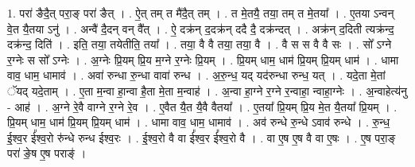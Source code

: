 \documentclass[17pt]{extarticle}
\begin{document}
1. परा॑ ङैदै॒त् परा॒ङ् परा॑ ङैत् । . ऐ॒त् तम् त मै॑दै॒त् तम् । . त मे॒तयै॒ तया॒ तम् त मे॒तया᳚ । . ए॒तया ऽन्वन् वे॒त यै॒तया ऽनु॑ । . अन्वै॑ दै॒दन् वन् वै᳚त् । . ऐ॒ दक्र॑न् द॒दक्र॑न् ददै दै॒ दक्र॑न्दत् । . अक्र॑न् द॒दिती त्यक्र॑न्द॒ दक्र॑न्द॒ दिति॑ । . इति॒ तया॒ तयेतीति॒ तया᳚ । . तया॒ वै वै तया॒ तया॒ वै । . वै स स वै वै सः । . सो᳚ ऽग्ने र॒ग्नेः स सो᳚ ऽग्नेः । . अ॒ग्नेः प्रि॒यम् प्रि॒य म॒ग्ने र॒ग्नेः प्रि॒यम् । . प्रि॒यम् धाम॒ धाम॑ प्रि॒यम् प्रि॒यम् धाम॑ । . धामा वाव॒ धाम॒ धामाव॑ । . अवा॑ रुन्धा रु॒न्धा वावा॑ रुन्ध । . अ॒रु॒न्ध॒ यद् यद॑रुन्धा रुन्ध॒ यत् । . यदे॒ता मे॒तां ॅयद् यदे॒ताम् । . ए॒ता म॒न्वा हा॒न्वा है॒ता मे॒ता म॒न्वाह॑ । . अ॒न्वा हा॒ग्ने र॒ग्ने र॒न्वाहा॒ न्वाहा॒ग्नेः । . अ॒न्वाहेत्य॑नु - आह॑ । . अ॒ग्ने रे॒वै वाग्ने र॒ग्ने रे॒व । . ए॒वैत यै॒त यै॒वै वैतया᳚ । . ए॒तया᳚ प्रि॒यम् प्रि॒य मे॒त यै॒तया᳚ प्रि॒यम् । . प्रि॒यम् धाम॒ धाम॑ प्रि॒यम् प्रि॒यम् धाम॑ । . धामा वाव॒ धाम॒ धामाव॑ । . अव॑ रुन्धे रु॒न्धे ऽवाव॑ रुन्धे । . रु॒न्ध॒ ई॒श्व॒र ई᳚श्व॒रो रु॑न्धे रुन्ध ईश्व॒रः । . ई॒श्व॒रो वै वा ई᳚श्व॒र ई᳚श्व॒रो वै । . वा ए॒ष ए॒ष वै वा ए॒षः । . ए॒ष परा॒ङ् परा॑ ङे॒ष ए॒ष पराङ्॑ । \newline
\end{document}
